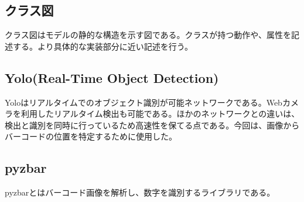 \subsection*{クラス図}
クラス図はモデルの静的な構造を示す図である。クラスが持つ動作や、属性を記述する。より具体的な実装部分に近い記述を行う。

\subsection*{Yolo(Real-Time Object Detection)}
Yoloはリアルタイムでのオブジェクト識別が可能ネットワークである。Webカメラを利用したリアルタイム検出も可能である。ほかのネットワークとの違いは、検出と識別を同時に行っているため高速性を保てる点である。今回は、画像からバーコードの位置を特定するために使用した\cite{yolo}。


\subsection*{pyzbar}
pyzbarとはバーコード画像を解析し、数字を識別するライブラリである\cite{pyzbar}。